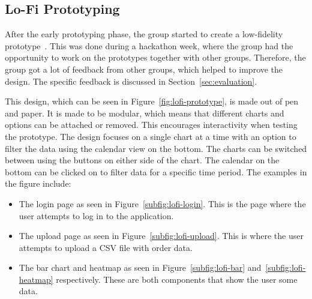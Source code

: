 \subsection{Lo-Fi Prototyping}\label{subsec:lo-fi-prototyping}

After the early prototyping phase, the group started to create a low-fidelity prototype~\cite{hi-lo-fidelity}.
This was done during a hackathon week, where the group had the opportunity to work on the prototypes together with
other groups.
Therefore, the group got a lot of feedback from other groups, which helped to improve the design.
The specific feedback is discussed in Section~\ref{sec:evaluation}.

This design, which can be seen in Figure~\ref{fig:lofi-prototype}, is made out of pen and paper.
It is made to be modular, which means that different charts and options can be attached or removed.
This encourages interactivity when testing the prototype.
The design focuses on a single chart at a time with an option to filter
the data using the calendar view on the bottom.
The charts can be switched between using the buttons on either side of the chart.
The calendar on the bottom can be clicked on to filter data for a specific time period.
The examples in the figure include:

\begin{itemize}
    \item The login page as seen in Figure~\ref{subfig:lofi-login}.
    This is the page where the user attempts to log in to the application.
    \item The upload page as seen in Figure~\ref{subfig:lofi-upload}.
    This is where the user attempts to upload a CSV file with order data.
    \item The bar chart and heatmap as seen in Figure~\ref{subfig:lofi-bar} and~\ref{subfig:lofi-heatmap} respectively.
    These are both components that show the user some data.
\end{itemize}


